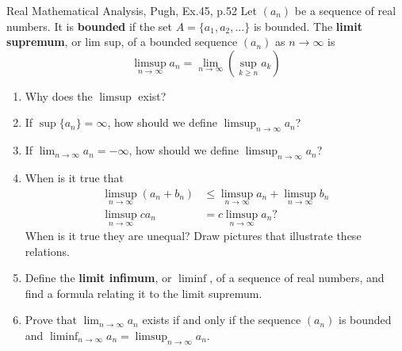 \begin{problem}{}{}{Real Mathematical Analysis, Pugh, Ex.45, p.52}
Let $(a_n)$ be a sequence of real numbers. It is \textbf{bounded} if the set $A = \{a_1, a_2, \dots \}$
is bounded. The \textbf{limit supremum}, or lim sup, of a bounded sequence $(a_n)$ as
$n \to \infty$ is
\[
    \limsup_{n \to \infty} a_n = \lim_{n \to \infty} \left( \sup_{k \ge n} a_k \right)
\]

\begin{enumerate}
    \item[(a)] Why does the $\limsup$ exist?
    \item[(b)] If $\sup \{a_n\} = \infty$, how should we define $\limsup_{n \to \infty} a_n$?
    \item[(c)] If $\lim_{n \to \infty} a_n = -\infty$, how should we define $\limsup_{n \to \infty} a_n$?
    \item[(d)] When is it true that
          \begin{align*}
              \limsup_{n \to \infty} (a_n + b_n) & \le \limsup_{n \to \infty} a_n + \limsup_{n \to \infty} b_n \\
              \limsup_{n \to \infty} c a_n       & = c \limsup_{n \to \infty} a_n ?
          \end{align*}
          When is it true they are unequal? Draw pictures that illustrate these relations.
    \item[(e)] Define the \textbf{limit infimum}, or $\liminf$, of a sequence of real numbers, and
          find a formula relating it to the limit supremum.
    \item[(f)] Prove that $\lim_{n \to \infty} a_n$ exists if and only if the sequence $(a_n)$ is bounded and
          $\liminf_{n \to \infty} a_n = \limsup_{n \to \infty} a_n$.
\end{enumerate}
\end{problem}

